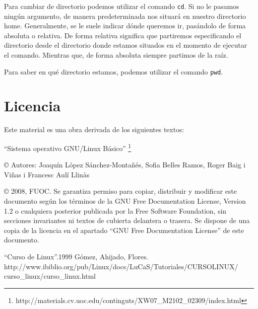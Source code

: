 \documentclass[12pt]{article}
\begin{document}
Para cambiar de directorio podemos utilizar el comando \texttt{cd}. Si no le pasamos ningún argumento, 
de manera predeterminada nos situará en nuestro directorio home. Generalmente, se le suele indicar 
dónde queremos ir, pasándolo de forma absoluta o relativa. De forma relativa significa que partiremos 
especificando el directorio desde el directorio donde estamos situados en el momento de ejecutar el comando. 
Mientras que, de forma absoluta siempre partimos de la raíz.


Para saber en qué directorio estamos, podemos utilizar el comando \texttt{pwd}.



\section{Licencia}

Este material es una obra derivada de los siguientes textos:

``Sistema operativo GNU/Linux Básico'' \footnote{http://materials.cv.uoc.edu/continguts/XW07\_M2102\_02309/index.html}

© Autores: Joaquín López Sánchez-Montañés, Sofia Belles Ramos, Roger Baig i Viñas i Francesc Aulí Llinàs

© 2008, FUOC. Se garantiza permiso para copiar, distribuir y modificar este documento según los
términos de la GNU Free Documentation License, Version 1.2 o cualquiera posterior publicada por la
Free Software Foundation, sin secciones invariantes ni textos de cubierta delantera o trasera. Se dispone
de una copia de la licencia en el apartado ``GNU Free Documentation License'' de este documento.

\begin{thebibliography}{1}
 ``Curso de Linux''.1999 Gómez, Ahijado, Flores.\\ 
http://www.ibiblio.org/pub/Linux/docs/LuCaS/Tutoriales/CURSOLINUX/\\curso\_linux/curso\_linux.html



\end{thebibliography}
\end{document}
